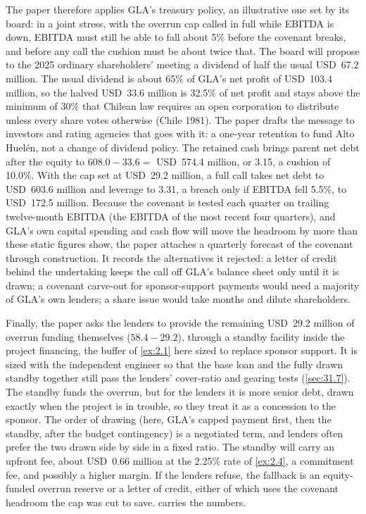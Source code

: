 \begin{enumerate}
The paper therefore applies GLA's treasury policy, an illustrative one set by its board: in a joint stress, with the overrun cap called in full while EBITDA is down, EBITDA must still be able to fall about 5\% before the covenant breaks, and before any call the cushion must be about twice that. The board will propose to the 2025 ordinary shareholders' meeting a dividend of half the usual USD~67.2 million. The usual dividend is about 65\% of GLA's net profit of USD~103.4 million, so the halved USD~33.6 million is 32.5\% of net profit and stays above the minimum of 30\% that Chilean law requires an open corporation to distribute unless every share votes otherwise (Chile 1981). The paper drafts the message to investors and rating agencies that goes with it: a one-year retention to fund Alto Huelén, not a change of dividend policy. The retained cash brings parent net debt after the equity to $608.0 - 33.6 = $ USD~574.4 million, or 3.15\x, a cushion of 10.0\%. With the cap set at USD~29.2 million, a full call takes net debt to USD~603.6 million and leverage to 3.31\x, a breach only if EBITDA fell 5.5\%, to USD~172.5 million. Because the covenant is tested each quarter on trailing twelve-month EBITDA (the EBITDA of the most recent four quarters), and GLA's own capital spending and cash flow will move the headroom by more than these static figures show, the paper attaches a quarterly forecast of the covenant through construction. It records the alternatives it rejected: a letter of credit behind the undertaking keeps the call off GLA's balance sheet only until it is drawn; a covenant carve-out for sponsor-support payments would need a majority of GLA's own lenders; a share issue would take months and dilute shareholders.

Finally, the paper asks the lenders to provide the remaining USD~29.2 million of overrun funding themselves ($58.4 - 29.2$), through a standby facility inside the project financing, the buffer of \cref{ex:2.1} here sized to replace sponsor support. It is sized with the independent engineer so that the base loan and the fully drawn standby together still pass the lenders' cover-ratio and gearing tests (\cref{sec:31.7}). The standby funds the overrun, but for the lenders it is more senior debt, drawn exactly when the project is in trouble, so they treat it as a concession to the sponsor. The order of drawing (here, GLA's capped payment first, then the standby, after the budget contingency) is a negotiated term, and lenders often prefer the two drawn side by side in a fixed ratio. The standby will carry an upfront fee, about USD~0.66 million at the 2.25\% rate of \cref{ex:2.4}, a commitment fee, and possibly a higher margin. If the lenders refuse, the fallback is an equity-funded overrun reserve or a letter of credit, either of which uses the covenant headroom the cap was cut to save.  carries the numbers.


\end{enumerate}
